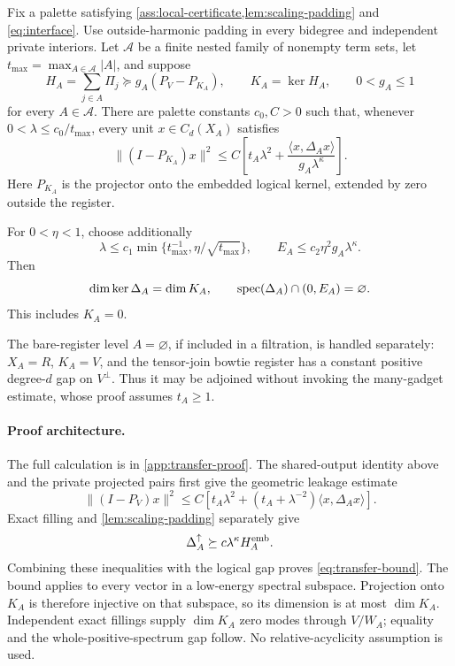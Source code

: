 \begin{theorem}
\label{thm:transfer}
Fix a palette satisfying \cref{ass:local-certificate,lem:scaling-padding} and
\cref{eq:interface}.  Use outside-harmonic padding in every bidegree and
independent private interiors.  Let \(\mathcal A\) be a finite nested family
of nonempty term sets, let
\(t_{\max}=\max_{A\in\mathcal A}|A|\), and suppose
\[
H_A=\sum_{j\in A}\Pi_j\succeq
g_A(P_V-P_{K_A}),\qquad K_A=\ker H_A,\qquad 0<g_A\le1
\]
for every \(A\in\mathcal A\).
There are palette constants \(c_0,C>0\) such that, whenever
\(0<\lambda\le c_0/t_{\max}\), every unit \(x\in C_d(X_A)\) satisfies
\begin{equation}
\label{eq:transfer-bound}
\boxed{\;
\|(I-P_{K_A})x\|^2
\le C\left[t_A\lambda^2+
\frac{\langle x,\Delta_Ax\rangle}{g_A\lambda^\kappa}\right].\;}
\end{equation}
Here \(P_{K_A}\) is the projector onto the embedded logical kernel, extended
by zero outside the register.

For \(0<\eta<1\), choose additionally
\begin{equation}
\label{eq:lambda-E-choice}
\lambda\le c_1\min\{t_{\max}^{-1},\eta/\sqrt{t_{\max}}\},
\qquad E_A\le c_2\eta^2g_A\lambda^\kappa.
\end{equation}
Then
\begin{equation}
\label{eq:kernel-gap-conclusion}
\dim\ker\Delta_A=\dim K_A,\qquad
\operatorname{spec}(\Delta_A)\cap(0,E_A)=\varnothing .
\end{equation}
This includes \(K_A=0\).
\end{theorem}

The bare-register level \(A=\varnothing\), if included in a filtration, is
handled separately: \(X_A=R\), \(K_A=V\), and the tensor-join bowtie register
has a constant positive degree-\(d\) gap on \(V^\perp\).  Thus it may be
adjoined without invoking the many-gadget estimate, whose proof assumes
\(t_A\ge1\).

\paragraph{Proof architecture.}
The full calculation is in \cref{app:transfer-proof}.  The shared-output
identity above and the private projected pairs first give the geometric
leakage estimate
\begin{equation}
\label{eq:geometric-leakage}
\|(I-P_V)x\|^2
\le C\left[t_A\lambda^2+
(t_A+\lambda^{-2})\langle x,\Delta_Ax\rangle\right].
\end{equation}
Exact filling and \cref{lem:scaling-padding} separately give
\begin{equation}
\label{eq:logical-domination}
\Delta_A^\uparrow\succeq c\lambda^\kappa H_A^{\rm emb}.
\end{equation}
Combining these inequalities with the logical gap proves
\cref{eq:transfer-bound}.  The bound applies to every vector in a low-energy
spectral subspace.  Projection onto \(K_A\) is therefore injective on that
subspace, so its dimension is at most \(\dim K_A\).  Independent exact
fillings supply \(\dim K_A\) zero modes through \(V/W_A\); equality and the
whole-positive-spectrum gap follow.  No relative-acyclicity assumption is
used.

